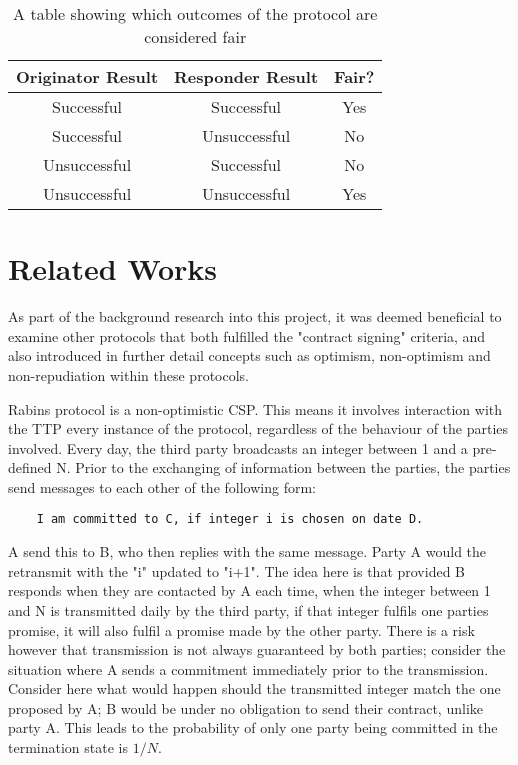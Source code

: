\documentclass{l4proj}
\begin{document}
\begin{table}[]
\centering
\begin{tabular}{c|c || c}
 Originator Result & Responder Result & Fair?  \\
 \hline
 Successful & Successful & Yes \\
  Successful & Unsuccessful & No \\
    Unsuccessful & Successful & No \\
      Unsuccessful & Unsuccessful & Yes
 
\end{tabular}
\caption{A table showing which outcomes of the protocol are considered fair}
\label{fair}
\end{table}

\section{Related Works}

As part of the background research into this project, it was deemed beneficial to examine other protocols that both fulfilled the "contract signing" criteria, and also introduced in further detail concepts such as optimism, non-optimism and non-repudiation within these protocols.

Rabins protocol is a non-optimistic CSP. This means it involves interaction with the TTP every instance of the protocol, regardless of the behaviour of the parties involved. Every day, the third party broadcasts an integer between 1 and a pre-defined N. Prior to the exchanging of information between the parties, the parties send messages to each other of the following form:
\begin{lstlisting}
    I am committed to C, if integer i is chosen on date D.
\end{lstlisting}
A send this to B, who then replies with the same message. Party A would the retransmit with the "i" updated to "i+1". The idea here is that provided B responds when they are contacted by A each time, when the integer between 1 and N is transmitted daily by the third party, if that integer fulfils one parties promise, it will also fulfil a promise made by the other party. There is a risk however that transmission is not always guaranteed by both parties; consider the situation where A sends a commitment immediately prior to the transmission. Consider here what would happen should the transmitted integer match the one proposed by A; B would be under no obligation to send their contract, unlike party A. This leads to the probability of only one party being committed in the termination state is $1/N$.
\end{document}
